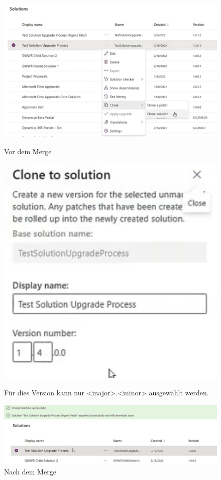 \begin{figure}[H]
	\centering
	\includegraphics[scale = 0.3]{attachment/chapter_13/Scc048}
	\caption{Vor dem Merge}
	\includegraphics[scale = 0.3]{attachment/chapter_13/Scc049}
	\caption{Für dies Version kann nur <major>.<minor> ausgewählt werden.}
	\includegraphics[scale = 0.3]{attachment/chapter_13/Scc050}
	\caption{Nach dem Merge}
\end{figure}

